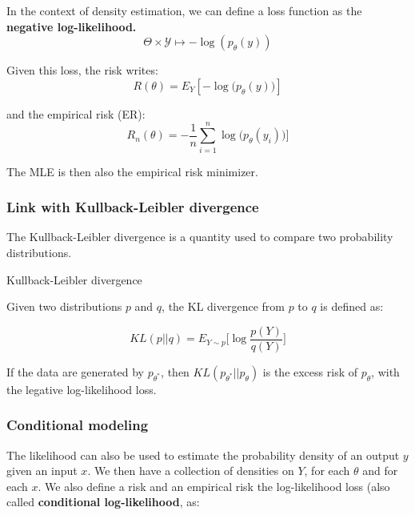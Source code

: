 \documentclass[
10pt, %
a4paper, %
oneside, %
headinclude,footinclude, %
BCOR5mm, %
]{scrartcl}
\begin{document}
In the context of density estimation, we can define a loss function as the \textbf{{negative log-likelihood.}}
\begin{equation*}
    \Theta\times \mathcal{Y} \mapsto - \log(p_{\theta}(y))
\end{equation*}

Given this loss, the risk writes:
\begin{equation*}
    R(\theta) = E_Y[-\log\big(p_{\theta}(y)\big)]
\end{equation*}

and the empirical risk (ER):
\begin{equation*}
    R_n(\theta) =-\frac{1}{n} \sum^{n}_{i=1} \log\big(p_{\theta}(y_i)\big)]
\end{equation*}

The MLE is then also the empirical risk minimizer.

\subsubsection{\large\color{Periwinkle}Link with Kullback-Leibler divergence}

The Kullback-Leibler divergence is a quantity used to compare two probability distributions.

\begin{definition}{Kullback-Leibler divergence}

    Given two distributions $p$ and $q$, the KL divergence from $p$ to $q$ is defined as:

    \begin{equation*}
	KL(p||q) = E_{Y\sim p} \Big[\log \frac{p(Y)}{q(Y)} \Big]
    \end{equation*}
\end{definition}

\begin{lemma}
    
    If the data are generated by $p_{\theta^*}$, then $ KL(p_{\theta^*}||p_{\theta})$ is the excess risk of $p_{\theta}$, with the legative log-likelihood loss.
\end{lemma}

\subsubsection{\large\color{Periwinkle}Conditional modeling}

The likelihood can also be used to estimate the probability density of an output $y$ given an input $x$. We then have a collection of densities on $Y$, for each $\theta$ and for each $x$. We also define a risk and an empirical risk the log-likelihood loss (also called \textbf{{conditional log-likelihood}}, as:
\end{document}
